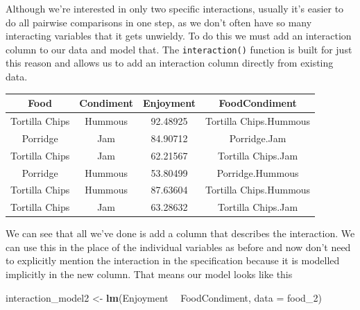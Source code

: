 \documentclass[
]{book}
\newenvironment{Shaded}{\begin{snugshade}}{\end{snugshade}}
\newcommand{\DataTypeTok}[1]{\textcolor[rgb]{0.13,0.29,0.53}{#1}}
\newcommand{\DecValTok}[1]{\textcolor[rgb]{0.00,0.00,0.81}{#1}}
\newcommand{\KeywordTok}[1]{\textcolor[rgb]{0.13,0.29,0.53}{\textbf{#1}}}
\newcommand{\NormalTok}[1]{#1}
\newcommand{\OperatorTok}[1]{\textcolor[rgb]{0.81,0.36,0.00}{\textbf{#1}}}
\newcommand{\StringTok}[1]{\textcolor[rgb]{0.31,0.60,0.02}{#1}}
\begin{document}
Although we're interested in only two specific interactions, usually it's easier to do all pairwise comparisons in one step, as we don't often have so many interacting variables that it gets unwieldy. To do this we must add an interaction column to our data and model that. The \texttt{interaction()} function is built for just this reason and allows us to add an interaction column directly from existing data.

\begin{Shaded}
\end{Shaded}

\begin{tabular}{c|c|c|c}
\hline
Food & Condiment & Enjoyment & FoodCondiment\\
\hline
Tortilla Chips & Hummous & 92.48925 & Tortilla Chips.Hummous\\
\hline
Porridge & Jam & 84.90712 & Porridge.Jam\\
\hline
Tortilla Chips & Jam & 62.21567 & Tortilla Chips.Jam\\
\hline
Porridge & Hummous & 53.80499 & Porridge.Hummous\\
\hline
Tortilla Chips & Hummous & 87.63604 & Tortilla Chips.Hummous\\
\hline
Tortilla Chips & Jam & 63.28632 & Tortilla Chips.Jam\\
\hline
\end{tabular}

We can see that all we've done is add a column that describes the interaction. We can use this in the place of the individual variables as before and now don't need to explicitly mention the interaction in the specification because it is modelled implicitly in the new column. That means our model looks like this

\begin{Shaded}
\begin{Highlighting}[]
\NormalTok{interaction_model2 <-}\StringTok{ }\KeywordTok{lm}\NormalTok{(Enjoyment }\OperatorTok{~}\StringTok{ }\NormalTok{FoodCondiment, }\DataTypeTok{data =}\NormalTok{ food_}\DecValTok{2}\NormalTok{)}
\end{Highlighting}
\end{Shaded}
\end{document}
